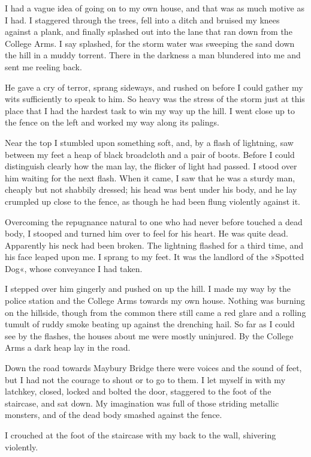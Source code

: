 I had a vague idea of going on to my own house, and that was as much motive as I had. I staggered through the trees, fell into a ditch and bruised my knees against a plank, and finally splashed out into the lane that ran down from the College Arms. I say splashed, for the storm water was sweeping the sand down the hill in a muddy torrent. There in the darkness a man blundered into me and sent me reeling back.

He gave a cry of terror, sprang sideways, and rushed on before I could gather my wits sufficiently to speak to him. So heavy was the stress of the storm just at this place that I had the hardest task to win my way up the hill. I went close up to the fence on the left and worked my way along its palings.

Near the top I stumbled upon something soft, and, by a flash of lightning, saw between my feet a heap of black broadcloth and a pair of boots. Before I could distinguish clearly how the man lay, the flicker of light had passed. I stood over him waiting for the next flash. When it came, I saw that he was a sturdy man, cheaply but not shabbily dressed; his head was bent under his body, and he lay crumpled up close to the fence, as though he had been flung violently against it.

Overcoming the repugnance natural to one who had never before touched a dead body, I stooped and turned him over to feel for his heart. He was quite dead. Apparently his neck had been broken. The lightning flashed for a third time, and his face leaped upon me. I sprang to my feet. It was the landlord of the »Spotted Dog«, whose conveyance I had taken.

I stepped over him gingerly and pushed on up the hill. I made my way by the police station and the College Arms towards my own house. Nothing was burning on the hillside, though from the common there still came a red glare and a rolling tumult of ruddy smoke beating up against the drenching hail. So far as I could see by the flashes, the houses about me were mostly uninjured. By the College Arms a dark heap lay in the road.

Down the road towards Maybury Bridge there were voices and the sound of feet, but I had not the courage to shout or to go to them. I let myself in with my latchkey, closed, locked and bolted the door, staggered to the foot of the staircase, and sat down. My imagination was full of those striding metallic monsters, and of the dead body smashed against the fence.


I crouched at the foot of the staircase with my back to the wall, shivering violently.

